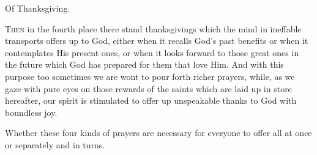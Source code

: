 
Of Thanksgiving.

\textsc{Then} in the fourth place there stand thanksgivings which the mind in ineffable transports offers up to God, either when it recalls God’s past benefits or when it contemplates His present ones, or when it looks forward to those great ones in the future which God has prepared for them that love Him. And with this purpose too sometimes we are wont to pour forth richer prayers, while, as we gaze with pure eyes on those rewards of the saints which are laid up in store hereafter, our spirit is stimulated to offer up unspeakable thanks to God with boundless joy.


Whether these four kinds of prayers are necessary for everyone to offer all at once or separately and in turns.

